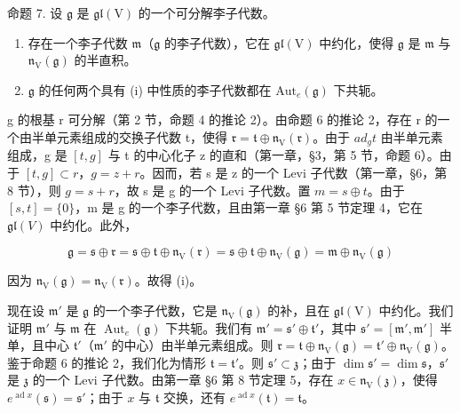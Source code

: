 命题 7. 设 \(\mathfrak{g}\) 是 \(\mathfrak{gl}(\mathrm{V})\) 的一个可分解李子代数。

\begin{enumerate}
\def\labelenumi{(\roman{enumi})}
\item
  存在一个李子代数 \(\mathfrak{m}\)（\(\mathfrak{g}\) 的李子代数），它在 \(\mathfrak{gl}(\mathrm{V})\) 中约化，使得 \(\mathfrak{g}\) 是 \(\mathfrak{m}\) 与 \(\mathfrak{n}_{\mathrm{V}}(\mathfrak{g})\) 的半直积。
\item
  \(\mathfrak{g}\) 的任何两个具有 (i) 中性质的李子代数都在 \(\mathrm{Aut}_e(\mathfrak{g})\) 下共轭。
\end{enumerate}

g 的根基 r 可分解（第 2 节，命题 4 的推论 2）。由命题 6 的推论 2，存在 r 的一个由半单元素组成的交换子代数 t，使得 \(\mathfrak{r} = \mathfrak{t} \oplus \mathfrak{n}_{\mathrm{V}}(\mathfrak{r})\)。由于 \(ad_{g}t\) 由半单元素组成，g 是 \([t, g]\) 与 t 的中心化子 z 的直和（第一章，§3，第 5 节，命题 6）。由于 \([t, g] \subset r\)，\(g = z + r\)。因而，若 s 是 z 的一个 Levi 子代数（第一章，§6，第 8 节），则 \(g = s + r\)，故 s 是 g 的一个 Levi 子代数。置 \(m = s \oplus t\)。由于 \([s, t] = \{0\}\)，m 是 g 的一个李子代数，且由第一章 §6 第 5 节定理 4，它在 \(\mathfrak{gl}(V)\) 中约化。此外，

\[
\mathfrak {g} = \mathfrak {s} \oplus \mathfrak {r} = \mathfrak {s} \oplus \mathfrak {t} \oplus \mathfrak {n} _ {\mathrm{V}} (\mathfrak {r}) = \mathfrak {s} \oplus \mathfrak {t} \oplus \mathfrak {n} _ {\mathrm{V}} (\mathfrak {g}) = \mathfrak {m} \oplus \mathfrak {n} _ {\mathrm{V}} (\mathfrak {g})
\]

因为 \(\mathfrak{n}_{\mathrm{V}}(\mathfrak{g}) = \mathfrak{n}_{\mathrm{V}}(\mathfrak{r})\)。故得 (i)。

现在设 \(\mathfrak{m}'\) 是 \(\mathfrak{g}\) 的一个李子代数，它是 \(\mathfrak{n}_{\mathrm{V}}(\mathfrak{g})\) 的补，且在 \(\mathfrak{gl}(\mathrm{V})\) 中约化。我们证明 \(\mathfrak{m}'\) 与 \(\mathfrak{m}\) 在 \(\operatorname{Aut}_e(\mathfrak{g})\) 下共轭。我们有 \(\mathfrak{m}' = \mathfrak{s}' \oplus \mathfrak{t}'\)，其中 \(\mathfrak{s}' = [\mathfrak{m}', \mathfrak{m}']\) 半单，且中心 \(\mathfrak{t}'\)（\(\mathfrak{m}'\) 的中心）由半单元素组成。则 \(\mathfrak{r} = \mathfrak{t} \oplus \mathfrak{n}_{\mathrm{V}}(\mathfrak{g}) = \mathfrak{t}' \oplus \mathfrak{n}_{\mathrm{V}}(\mathfrak{g})\)。鉴于命题 6 的推论 2，我们化为情形 \(\mathfrak{t} = \mathfrak{t}'\)。则 \(\mathfrak{s}' \subset \mathfrak{z}\)；由于 \(\dim \mathfrak{s}' = \dim \mathfrak{s}\)，\(\mathfrak{s}'\) 是 \(\mathfrak{z}\) 的一个 Levi 子代数。由第一章 §6 第 8 节定理 5，存在 \(x \in \mathfrak{n}_{\mathrm{V}}(\mathfrak{z})\)，使得 \(e^{\operatorname{ad} x}(\mathfrak{s}) = \mathfrak{s}'\)；由于 \(x\) 与 \(\mathfrak{t}\) 交换，还有 \(e^{\operatorname{ad} x}(\mathfrak{t}) = \mathfrak{t}\)。

